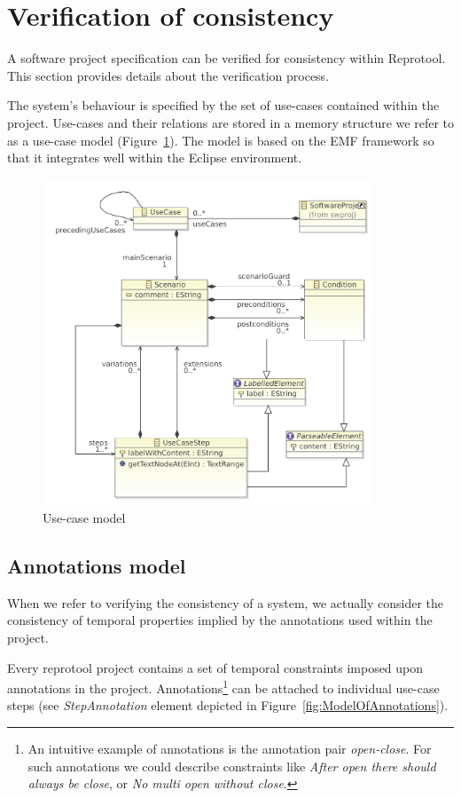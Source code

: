\section{Verification of consistency}

A software project specification can be verified for consistency within Reprotool.
This section provides details about the verification process.

The system's behaviour is specified by the set of use-cases contained within the project.
Use-cases and their relations are stored in a memory structure we refer to as a use-case model (Figure~\ref{fig:ReprotoolUCModel}).
The model is based on the EMF framework so that it integrates well within the Eclipse environment.

\begin{figure}[ht]
  \centering
  \includegraphics[width=280pt]{images/ReprotoolUCModel}
  \caption{Use-case model}
  \label{fig:ReprotoolUCModel}
\end{figure}

\subsection{Annotations model}

When we refer to verifying the consistency of a system, we actually consider the consistency of temporal properties implied by the annotations used within the project.

Every reprotool project contains a set of temporal constraints imposed upon annotations in the project.
Annotations\footnote{An intuitive example of annotations is the annotation pair \emph{open-close}. For such annotations we could describe constraints like \emph{After open there should always be close}, or \emph{No multi open without close}.} can be attached to individual use-case steps (see \emph{StepAnnotation} element depicted in Figure~\ref{fig:ModelOfAnnotations}).


